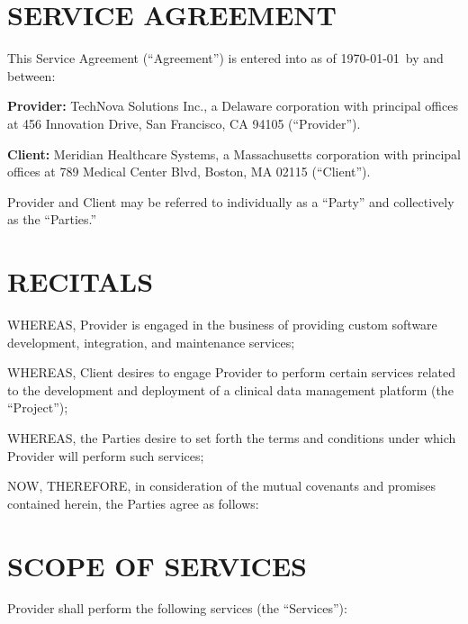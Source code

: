 \documentclass[
    language=english,
    doctype=contract,
    institution=none,
]{../../omnilatex}
\begin{document}
\maketitle

\section*{SERVICE AGREEMENT}

This Service Agreement (``Agreement'') is entered into as of \today\ by and between:

\textbf{Provider:} TechNova Solutions Inc., a Delaware corporation with principal offices at 456 Innovation Drive, San Francisco, CA 94105 (``Provider'').

\textbf{Client:} Meridian Healthcare Systems, a Massachusetts corporation with principal offices at 789 Medical Center Blvd, Boston, MA 02115 (``Client'').

Provider and Client may be referred to individually as a ``Party'' and collectively as the ``Parties.''

\section{RECITALS}

WHEREAS, Provider is engaged in the business of providing custom software development, integration, and maintenance services;

WHEREAS, Client desires to engage Provider to perform certain services related to the development and deployment of a clinical data management platform (the ``Project'');

WHEREAS, the Parties desire to set forth the terms and conditions under which Provider will perform such services;

NOW, THEREFORE, in consideration of the mutual covenants and promises contained herein, the Parties agree as follows:

\section{SCOPE OF SERVICES}

Provider shall perform the following services (the ``Services''):
\end{document}
